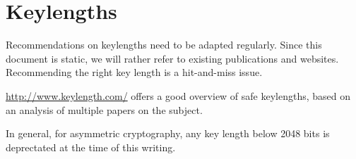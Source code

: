 \section{Keylengths}

Recommendations on keylengths need to be adapted regularly. Since this document is static, we will rather refer to 
existing publications and websites.  Recommending the right key length is a hit-and-miss issue.

\url{http://www.keylength.com/} offers a good overview of safe keylengths, based on an analysis of multiple papers on the subject.

In general, for asymmetric cryptography, any key length below 2048 bits is deprectated at the time of this writing.




